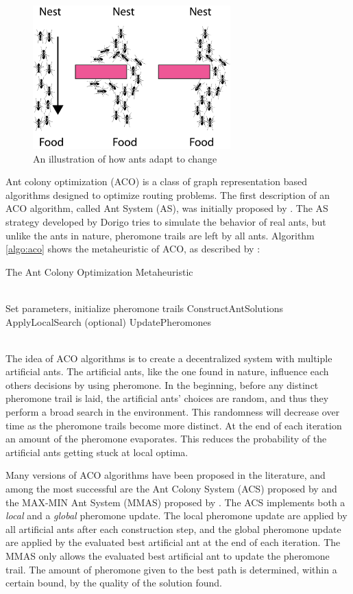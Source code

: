 \begin{figure}[H]
  \centering
  \includegraphics[width=3in]{assets/maur.png}
  \caption{An illustration of how ants adapt to change} 
   \label{fig:ants}
\end{figure}

Ant colony optimization (ACO) is a class of graph representation based algorithms designed to optimize routing problems. The first description of an ACO algorithm, called Ant System (AS), was initially proposed by \citet{dorigo96}. The AS strategy developed by Dorigo tries to simulate the behavior of real ants, but unlike the ants in nature, pheromone trails are left by all ants. Algorithm \ref{algo:aco} shows the metaheuristic of ACO, as described by \citet{dorigo06}:
\begin{algorithm}[H]
\caption{The Ant Colony Optimization Metaheuristic}
\label{algo:aco}
\begin{algorithmic}
\\ Set parameters, initialize pheromone trails
    \State ConstructAntSolutions
    \State ApplyLocalSearch (optional)
    \State UpdatePheromones
  \EndWhile
\end{algorithmic}
\end{algorithm}
~\\

The idea of ACO algorithms is to create a decentralized system with multiple artificial ants. The artificial ants, like the one found in nature, influence each others decisions by using pheromone. In the beginning, before any distinct pheromone trail is laid, the artificial ants' choices are random, and thus they perform a broad search in the environment. This randomness will decrease over time as the pheromone trails become more distinct. At the end of each iteration an amount of the pheromone evaporates. This reduces the probability of the artificial ants getting stuck at local optima. 

Many versions of ACO algorithms have been proposed in the literature, and among the most successful are the Ant Colony System (ACS) proposed by \citet{dorigo97} and the MAX-MIN Ant System (MMAS) proposed by \citet{stutzle06}. The ACS implements both a \textit{local} and a \textit{global} pheromone update. The local pheromone update are applied by all artificial ants after each construction step, and the global pheromone update are applied by the evaluated best artificial ant at the end of each iteration. The MMAS only allows the evaluated best artificial ant to update the pheromone trail. The amount of pheromone given to the best path is determined, within a certain bound, by the quality of the solution found. 

